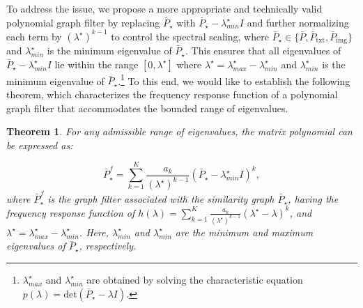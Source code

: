 \documentclass[a4paper,fleqn]{cas-sc}
\newtheorem{theorem}{Theorem}[section]  %
\begin{document}
To address the issue, we propose a more appropriate and technically valid polynomial graph filter by replacing $\bar P_\star$ with $\bar P_\star - \lambda_{min}^\star I$ and further normalizing each term by $(\lambda^\star)^{k-1}$ to control the spectral scaling, where $\bar P_{\star} \in \{\bar P,\bar P_{\text{txt}},\bar P_{\text{img}}\}$ and $\lambda^{\star}_{min}$ is the minimum eigenvalue of $\bar P_{\star}$. This ensures that all eigenvalues of $\bar P_\star - \lambda_{min}^\star I$ lie within the range $[0, \lambda^\star]$ where $\lambda^{\star}=\lambda_{max}^{\star}-\lambda_{min}^{\star}$ and $\lambda_{min}^{\star}$ is the minimum eigenvalue of $\bar P_{\star}$.\footnote{$\lambda_{max}^\star$ and $\lambda_{min}^\star$ are obtained by solving the characteristic equation $p(\lambda) = \text{det}(\bar P_\star -\lambda  I)$.} To this end, we would like to establish the following theorem, which characterizes the frequency response function of a polynomial graph filter that accommodates the bounded range of eigenvalues.

\begin{theorem}
    \label{thm_poly}
     For any admissible range of eigenvalues, the matrix polynomial can be expressed as:

     \begin{equation}
     \label{poly_filter}
         \bar P ^f_\star = \sum_{k=1}^{K} \frac{a_k}{(\lambda^\star)^{k-1}} (\bar{P}_\star-\lambda_{min}^\star  I)^k,
     \end{equation}
     where $\bar P^f_\star$ is the graph filter associated with the similarity graph $\bar{P}_\star$, having the frequency response function of $h(\lambda)=\sum_{k=1}^K\frac{a_k}{(\lambda^\star)^{k-1}} (\lambda^\star-\lambda)^k$, and $\lambda^\star = \lambda^\star_{max} - \lambda^\star_{min}$. Here, $\lambda^\star_{min}$ and $\lambda^\star_{min}$ are the minimum and maximum eigenvalues of $\bar P_\star$, respectively.
\end{theorem}
\end{document}

